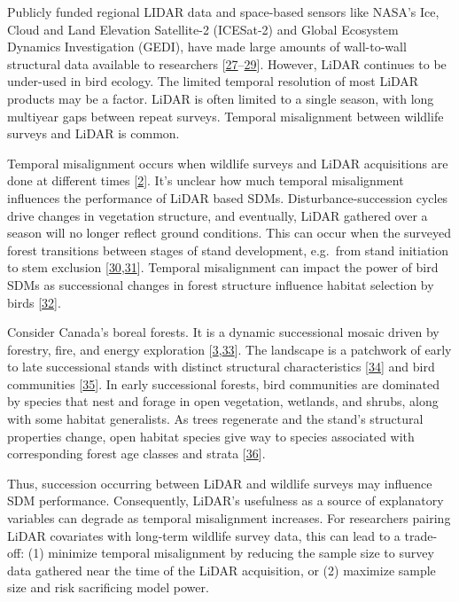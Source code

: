 \documentclass[manuscript, 3p, authoryear]{elsarticle} %
\begin{document}
Publicly funded regional LIDAR data and space-based sensors like NASA's Ice, Cloud and Land Elevation Satellite-2 (ICESat-2) and Global Ecosystem Dynamics Investigation (GEDI), have made large amounts of wall-to-wall structural data available to researchers {[}\protect\hyperlink{ref-coopsForestStructureHabitat2016}{27}--\protect\hyperlink{ref-abdalatiICESat2LaserAltimetry2010}{29}{]}. However, LiDAR continues to be under-used in bird ecology. The limited temporal resolution of most LiDAR products may be a factor. LiDAR is often limited to a single season, with long multiyear gaps between repeat surveys. Temporal misalignment between wildlife surveys and LiDAR is common.

Temporal misalignment occurs when wildlife surveys and LiDAR acquisitions are done at different times {[}\protect\hyperlink{ref-VierlingSwift2014}{2}{]}. It's unclear how much temporal misalignment influences the performance of LiDAR based SDMs. Disturbance-succession cycles drive changes in vegetation structure, and eventually, LiDAR gathered over a season will no longer reflect ground conditions. This can occur when the surveyed forest transitions between stages of stand development, e.g.~from stand initiation to stem exclusion {[}\protect\hyperlink{ref-babcockModelingForestBiomass2016}{30},\protect\hyperlink{ref-brassardStandStructureComposition2010}{31}{]}. Temporal misalignment can impact the power of bird SDMs as successional changes in forest structure influence habitat selection by birds {[}\protect\hyperlink{ref-sittersAssociationsOccupancyHabitat2014}{32}{]}.

Consider Canada's boreal forests. It is a dynamic successional mosaic driven by forestry, fire, and energy exploration {[}\protect\hyperlink{ref-Brandt2013}{3},\protect\hyperlink{ref-gauthierBorealForestHealth2015}{33}{]}. The landscape is a patchwork of early to late successional stands with distinct structural characteristics {[}\protect\hyperlink{ref-Bergeron2012}{34}{]} and bird communities {[}\protect\hyperlink{ref-Schieck2006}{35}{]}. In early successional forests, bird communities are dominated by species that nest and forage in open vegetation, wetlands, and shrubs, along with some habitat generalists. As trees regenerate and the stand's structural properties change, open habitat species give way to species associated with corresponding forest age classes and strata {[}\protect\hyperlink{ref-lestonLongtermChangesBoreal2018}{36}{]}.

Thus, succession occurring between LiDAR and wildlife surveys may influence SDM performance. Consequently, LiDAR's usefulness as a source of explanatory variables can degrade as temporal misalignment increases. For researchers pairing LiDAR covariates with long-term wildlife survey data, this can lead to a trade-off: (1) minimize temporal misalignment by reducing the sample size to survey data gathered near the time of the LiDAR acquisition, or (2) maximize sample size and risk sacrificing model power.
\end{document}
